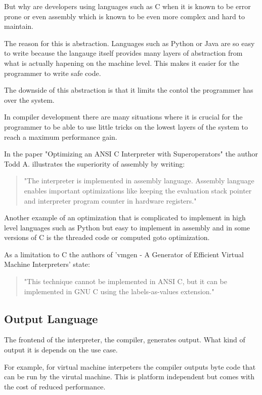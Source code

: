 \documentclass{article}
\begin{document}
But why are developers using languages such as C when it is known to be error
prone or even assembly which is known to be even more complex and hard to
maintain.

The reason for this is abstraction. Languages such as Python or Java are so
easy to write because the langauge itself provides many layers of abstraction
from what is actually hapening on the machine level. This makes it easier for
the programmer to write safe code. 

The downside of this abstraction is that it limits the contol the programmer
has over the system.

In compiler development there are many situations where it is crucial for the
programmer to be able to use little tricks on the lowest layers of the system
to reach a maximum performance gain.

In the paper "Optimizing an ANSI C Interpreter with Superoperators" the author
Todd A. illustrates the superiority of assembly by writing:

\begin{quotation}
"The interpreter is implemented in assembly language.
Assembly language enables important optimizations like keeping the evaluation
stack pointer and interpreter program counter in hardware registers." ~\cite{superoperators}
\end{quotation}

Another example of an optimization that is complicated to implement in high
level languages such as Python but easy to implement in assembly and in some
versions of C is the threaded code or computed goto optimization.

As a limitation to C the authors of 'vmgen - A Generator of Efficient Virtual
Machine Interpreters' state:
\begin{quotation} 
"This technique cannot be implemented in ANSI C, but it can be implemented in
GNU C using the labels-as-values extension." ~\cite{vmgen} 
\end{quotation}

\subsection{Output Language}
The frontend of the interpreter, the compiler, generates output. What kind
of output it is depends on the use case.

For example, for virtual machine interpeters the compiler outputs byte code that
can be run by the virutal machine. This is platform independent but comes with
the cost of reduced performance.
\end{document}
